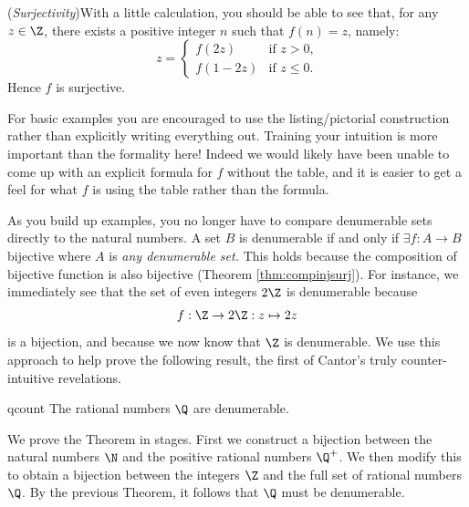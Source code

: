 (\emph{Surjectivity})\quad With a little calculation, you should be able to see that, for any $z\in\Z$, there exists a positive integer $n$ such that $f(n)=z$, namely:
\[
	z=
	\begin{cases}
		f(2z)&\text{if $z>0$,}\\
		f(1-2z)&\text{if $z\le 0$.}
	\end{cases}
\]
Hence $f$ is surjective.\par

For basic examples you are encouraged to use the listing/pictorial construction rather than explicitly writing everything out. Training your intuition is more important than the formality here! Indeed we would likely have been unable to come up with an explicit formula for $f$ without the table, and it is easier to get a feel for what $f$ is using the table rather than the formula.\par

As you build up examples, you no longer have to compare denumerable sets directly to the natural numbers. A set $B$ is denumerable if and only if $\exists f:A\to B$ bijective where $A$ is \emph{any denumerable set.} This holds because the composition of bijective function is also bijective (Theorem \ref{thm:compinjsurj}). For instance, we immediately see that the set of even integers $2\Z$ is denumerable because
\[
	f:\Z\to 2\Z:z\mapsto 2z
\]
is a bijection, and because we now know that $\Z$ is denumerable. We use this approach to help prove the following result, the first of Cantor's truly counter-intuitive revelations.

\begin{thm}{}{qcount}
	The rational numbers $\Q$ are denumerable.
\end{thm}

We prove the Theorem in stages. First we construct a bijection between the natural numbers $\N$ and the positive rational numbers $\Q^+$. We then modify this to obtain a bijection between the integers $\Z$ and the full set of rational numbers $\Q$. By the previous Theorem, it follows that $\Q$ must be denumerable.

